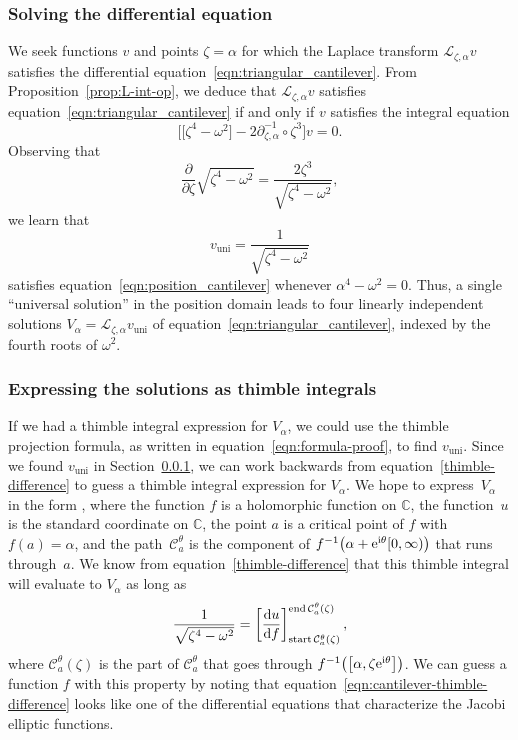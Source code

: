 \documentclass[pdftex]{sigma}
\newcommand{\C}{\mathbb{C}}
\newcommand{\fracderiv}[3]{\partial^{#1}_{#2, #3}}
\newcommand{\laplace}{\mathcal{L}}
\numberwithin{equation}{section}
\begin{document}
\subsubsection{Solving the differential equation}\label{sec:solve-cantilever-eqn}
We seek functions $v$ and points $\zeta = \alpha$ for which the Laplace transform $\laplace_{\zeta, \alpha} v$ satisfies the differential equation~\eqref{eqn:triangular_cantilever}. From Proposition~\ref{prop:L-int-op}, we deduce that $\laplace_{\zeta, \alpha} v$ satisfies equation~\eqref{eqn:triangular_cantilever} if and only if $v$ satisfies the integral equation
\begin{equation}\label{eqn:position_cantilever}
\bigl[ \bigl[ \zeta^4 - \omega^2 \bigr] - 2\fracderiv{-1}{\zeta}{\alpha} \circ \zeta^3 \bigr] v = 0.
\end{equation}
Observing that
\[ \frac{\partial}{\partial \zeta} \sqrt{\zeta^4 - \omega^2} = \frac{2\zeta^3}{\sqrt{\zeta^4 - \omega^2}}, \]
we learn that
\[
v_\text{uni} = \frac{1}{\sqrt{\zeta^4 - \omega^2}}
\]
satisfies equation~\eqref{eqn:position_cantilever} whenever $\alpha^4 - \omega^2 = 0$. Thus, a single ``universal solution'' in the position domain leads to four linearly independent solutions $V_\alpha = \laplace_{\zeta, \alpha} v_\text{uni}$ of equation~\eqref{eqn:triangular_cantilever}, indexed by the fourth roots of $\omega^2$.
\subsubsection{Expressing the solutions as thimble integrals}
If we had a thimble integral expression for $V_\alpha$, we could use the thimble projection formula, as written in equation~\eqref{eqn:formula-proof}, to find $v_\text{uni}$. Since we found $v_\text{uni}$ in Section~\ref{sec:solve-cantilever-eqn}, we can work backwards from equation~\eqref{thimble-difference} to guess a thimble integral expression for $V_\alpha$. We hope to express~$V_\alpha$ in the form
,
where the function $f$ is a holomorphic function on $\C$, the function~$u$ is the standard coordinate on $\C$, the point $a$ is a critical point of $f$ with $f(a) = \alpha$, and the path~$\mathcal{C}_a^\theta$ is the component of $f^{-1}\bigl(\alpha + {\rm e}^{{\rm i}\theta}[0, \infty)\bigr)$ that runs through~$a$. We know from equation~\eqref{thimble-difference} that this thimble integral will evaluate to $V_\alpha$ as long as
\begin{equation}\label{eqn:cantilever-thimble-difference}
\frac{1}{\sqrt{\zeta^4-\omega^2}} = \left[\frac{{\rm d}u}{{\rm d}f}\right]_{\operatorname{start} \mathcal{C}_a^\theta(\zeta)}^{\operatorname{end} \mathcal{C}_a^\theta(\zeta)},
\end{equation}
where $\mathcal{C}_a^\theta(\zeta)$ is the part of $\mathcal{C}_a^\theta$ that goes through $f^{-1}\bigl(\bigl[\alpha,\zeta {\rm e}^{{\rm i}\theta}\bigr]\bigr)$. We can guess a function $f$ with this property by noting that equation~\eqref{eqn:cantilever-thimble-difference} looks like one of the differential equations that characterize the Jacobi elliptic functions.
\end{document}
